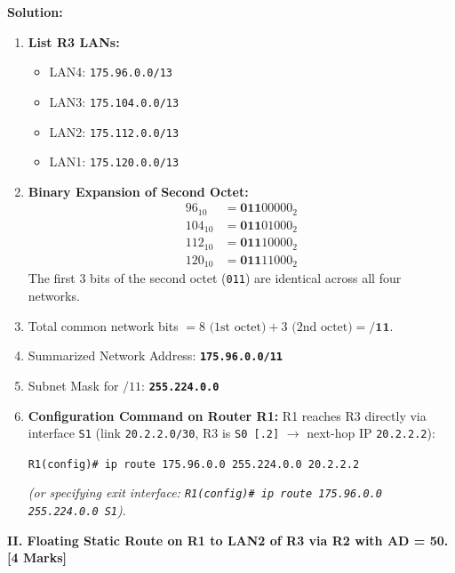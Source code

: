 \documentclass[11pt,a4paper]{article}
\begin{document}
\textbf{Solution:}
\begin{enumerate}
    \item \textbf{List R3 LANs:}
    \begin{itemize}
        \item LAN4: \texttt{175.96.0.0/13}
        \item LAN3: \texttt{175.104.0.0/13}
        \item LAN2: \texttt{175.112.0.0/13}
        \item LAN1: \texttt{175.120.0.0/13}
    \end{itemize}

    \item \textbf{Binary Expansion of Second Octet:}
    \[
    \begin{aligned}
    96_{10}  &= \mathbf{011}00000_2 \\
    104_{10} &= \mathbf{011}01000_2 \\
    112_{10} &= \mathbf{011}10000_2 \\
    120_{10} &= \mathbf{011}11000_2
    \end{aligned}
    \]
    The first 3 bits of the second octet (\texttt{011}) are identical across all four networks.
    \item Total common network bits $= 8 \text{ (1st octet)} + 3 \text{ (2nd octet)} = \mathbf{/11}$.
    \item Summarized Network Address: \textbf{\texttt{175.96.0.0/11}}
    \item Subnet Mask for $/11$: \textbf{\texttt{255.224.0.0}}
    \item \textbf{Configuration Command on Router R1:}
    R1 reaches R3 directly via interface \texttt{S1} (link \texttt{20.2.2.0/30}, R3 is \texttt{S0 [.2]} $\to$ next-hop IP \texttt{20.2.2.2}):
    \begin{center}
        \texttt{R1(config)\# ip route 175.96.0.0 255.224.0.0 20.2.2.2}
    \end{center}
    \textit{(or specifying exit interface: \texttt{R1(config)\# ip route 175.96.0.0 255.224.0.0 S1})}.
\end{enumerate}

\vspace{0.2cm}
\textbf{II. Floating Static Route on R1 to LAN2 of R3 via R2 with AD = 50. [4 Marks]}
\end{document}

